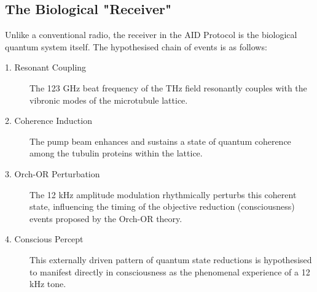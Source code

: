 \subsection{The Biological "Receiver"}

Unlike a conventional radio, the receiver in the AID Protocol is the biological quantum system itself. The hypothesised chain of events is as follows:
\begin{description}
    \item[1. Resonant Coupling] The 123 GHz beat frequency of the THz field resonantly couples with the vibronic modes of the microtubule lattice.
    \item[2. Coherence Induction] The pump beam enhances and sustains a state of quantum coherence among the tubulin proteins within the lattice.
    \item[3. Orch-OR Perturbation] The 12 kHz amplitude modulation rhythmically perturbs this coherent state, influencing the timing of the objective reduction (consciousness) events proposed by the Orch-OR theory.
    \item[4. Conscious Percept] This externally driven pattern of quantum state reductions is hypothesised to manifest directly in consciousness as the phenomenal experience of a 12 kHz tone.
\end{description}


